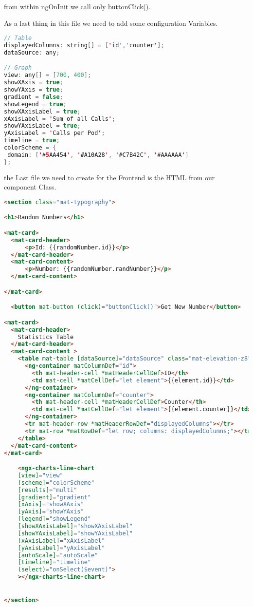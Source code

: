 from within ngOnInit we call only buttonClick().

As a last thing in this file we need to add some configuration Variables.
\begin{lstlisting}[language=Java]
// Table
displayedColumns: string[] = ['id','counter'];
dataSource: any;

// Graph
view: any[] = [700, 400];
showXAxis = true;
showYAxis = true;
gradient = false;
showLegend = true;
showXAxisLabel = true;
xAxisLabel = 'Sum of all Calls';
showYAxisLabel = true;
yAxisLabel = 'Calls per Pod';
timeline = true;
colorScheme = {
 domain: ['#5AA454', '#A10A28', '#C7B42C', '#AAAAAA']
};
\end{lstlisting}

the Last file we need to create for the Frontend is the HTML from our component Class.
\begin{lstlisting}[language=HTML]
<section class="mat-typography">

<h1>Random Numbers</h1>

<mat-card>
  <mat-card-header>
      <p>Id: {{randomNumber.id}}</p>
  </mat-card-header>
  <mat-card-content>
      <p>Number: {{randomNumber.randNumber}}</p>
  </mat-card-content>

</mat-card>

  <button mat-button (click)="buttonClick()">Get New Number</button>

<mat-card>
  <mat-card-header>
    Statistics Table
  </mat-card-header>
  <mat-card-content >
    <table mat-table [dataSource]="dataSource" class="mat-elevation-z8">
      <ng-container matColumnDef="id">
        <th mat-header-cell *matHeaderCellDef>ID</th>
        <td mat-cell *matCellDef="let element">{{element.id}}</td>
      </ng-container>
      <ng-container matColumnDef="counter">
        <th mat-header-cell *matHeaderCellDef>Counter</th>
        <td mat-cell *matCellDef="let element">{{element.counter}}</td>
      </ng-container>
      <tr mat-header-row *matHeaderRowDef="displayedColumns"></tr>
      <tr mat-row *matRowDef="let row; columns: displayedColumns;"></tr>
    </table>
  </mat-card-content>
</mat-card>

    <ngx-charts-line-chart 
    [view]="view"
    [scheme]="colorScheme"
    [results]="multi"
    [gradient]="gradient"
    [xAxis]="showXAxis"
    [yAxis]="showYAxis"
    [legend]="showLegend"
    [showXAxisLabel]="showXAxisLabel"
    [showYAxisLabel]="showYAxisLabel"
    [xAxisLabel]="xAxisLabel"
    [yAxisLabel]="yAxisLabel"
    [autoScale]="autoScale"
    [timeline]="timeline"
    (select)="onSelect($event)">
    ></ngx-charts-line-chart>


</section>
\end{lstlisting}